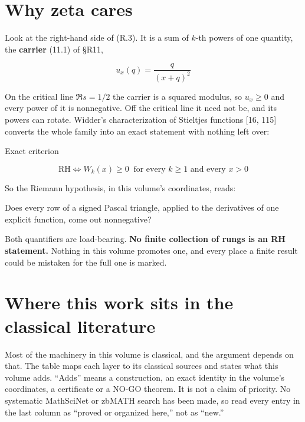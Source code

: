\documentclass[
  11pt,
]{book}
\renewenvironment{quote}
  {\begin{tcolorbox}[
      enhanced,
      breakable,
      colback=tncream,
      colframe=tnrust,
      boxrule=0.8pt,
      arc=1.5pt,
      left=7pt,
      right=7pt,
      top=6pt,
      bottom=6pt]}
  {\end{tcolorbox}}
\begin{document}
\section{Why zeta cares}\label{why-zeta-cares}

Look at the right-hand side of (R.3). It is a sum of \(k\)-th powers of
one quantity, the \textbf{carrier} (11.1) of §R11,

\[
u_x(q)=\frac{q}{(x+q)^{2}}
\]

On the critical line \(\Re s=1/2\) the carrier is a squared modulus, so
\(u_x\ge0\) and every power of it is nonnegative. Off the critical line
it need not be, and its powers can rotate. Widder's characterization of
Stieltjes functions {[}16, 115{]} converts the whole family into an
exact statement with nothing left over:

\begin{tnequiv}{Exact criterion}

\[
\boxed{\mathrm{RH}\iff W_k(x)\ge0
\ \text{ for every }k\ge1\text{ and every }x>0}
\tag{R.4}
\]

\end{tnequiv}

So the Riemann hypothesis, in this volume's coordinates, reads:

\begin{quote}
Does every row of a signed Pascal triangle, applied to the derivatives
of one explicit function, come out nonnegative?
\end{quote}

Both quantifiers are load-bearing. \textbf{No finite collection of rungs
is an RH statement.} Nothing in this volume promotes one, and every
place a finite result could be mistaken for the full one is marked.

\section{Where this work sits in the classical
literature}\label{where-this-work-sits-in-the-classical-literature}

Most of the machinery in this volume is classical, and the argument
depends on that. The table maps each layer to its classical sources and
states what this volume adds. ``Adds'' means a construction, an exact
identity in the volume's coordinates, a certificate or a NO-GO theorem.
It is not a claim of priority. No systematic MathSciNet or zbMATH search
has been made, so read every entry in the last column as ``proved or
organized here,'' not as ``new.''
\end{document}
